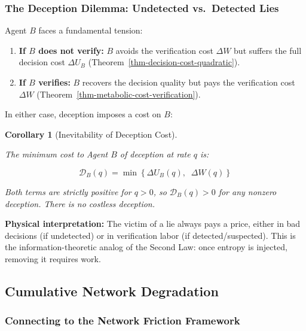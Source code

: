 \documentclass[11pt]{article}
\theoremstyle{plain}
\newtheorem{corollary}[theorem]{Corollary}
\theoremstyle{definition}
\theoremstyle{remark}
\let\origsubsection\subsection
\renewcommand{\subsection}{\needspace{7\baselineskip}\origsubsection}
\let\origsubsubsection\subsubsection
\renewcommand{\subsubsection}{\needspace{4\baselineskip}\origsubsubsection}
\providecommand{\tightlist}{%
  \setlength{\itemsep}{0pt}\setlength{\parskip}{0pt}}
\begin{document}
\subsubsection{The Deception Dilemma: Undetected vs.~Detected
Lies}\label{the-deception-dilemma-undetected-vs.-detected-lies}

Agent \(B\) faces a fundamental tension:

\begin{enumerate}
\def\labelenumi{\arabic{enumi}.}
\tightlist
\item
  \textbf{If \(B\) does not verify:} \(B\) avoids the verification cost
  \(\Delta W\) but suffers the full decision cost \(\Delta U_B\)
  (Theorem~\ref{thm-decision-cost-quadratic}).
\item
  \textbf{If \(B\) verifies:} \(B\) recovers the decision quality but
  pays the verification cost \(\Delta W\)
  (Theorem~\ref{thm-metabolic-cost-verification}).
\end{enumerate}

In either case, deception imposes a cost on \(B\):

\begin{corollary}[Inevitability of Deception Cost]
\label{cor-inevitability-deception-cost}

The minimum cost to Agent $B$ of deception at rate $q$ is:

$$\mathcal{D}_B(q) = \min\left\{\Delta U_B(q), \;\; \Delta W(q) \right\}$$

Both terms are strictly positive for $q > 0$, so $\mathcal{D}_B(q) > 0$ for any nonzero deception. There is no costless deception.
\end{corollary}

\textbf{Physical interpretation:} The victim of a lie always pays a
price, either in bad decisions (if undetected) or in verification labor
(if detected/suspected). This is the information-theoretic analog of the
Second Law: once entropy is injected, removing it requires work.

\subsection{Cumulative Network
Degradation}\label{cumulative-network-degradation}

\subsubsection{Connecting to the Network Friction
Framework}\label{connecting-to-the-network-friction-framework}
\end{document}
